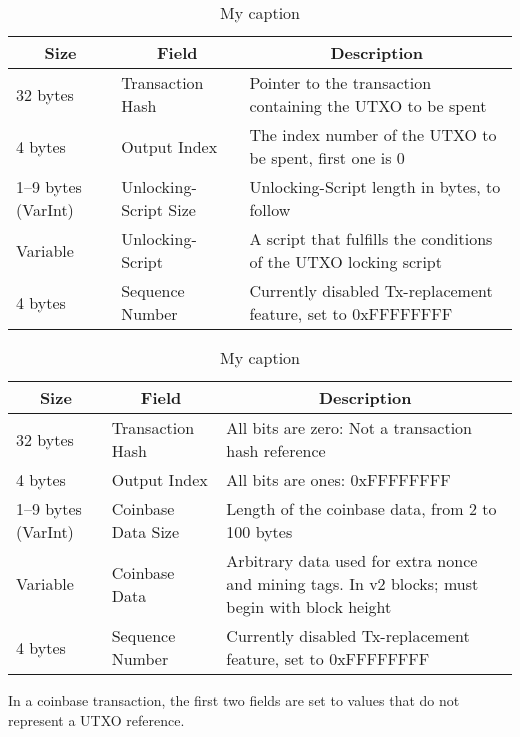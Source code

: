 \documentclass[english, 11pt]{article}
\begin{document}
\begin{table}[H]
\centering
\caption{My caption}
\label{my-label}
\begin{tabular}{|l|l|l|}
\hline
\multicolumn{1}{|c|}{\textbf{Size}} & \multicolumn{1}{c|}{\textbf{Field}} & \multicolumn{1}{c|}{\textbf{Description}} \\ \hline
32 bytes & Transaction Hash & Pointer to the transaction containing the UTXO to be spent \\ \hline
4 bytes & Output Index & The index number of the UTXO to be spent, first one is 0 \\ \hline
1–9 bytes (VarInt) & Unlocking-Script Size & Unlocking-Script length in bytes, to follow \\ \hline
Variable & Unlocking-Script & A script that fulfills the conditions of the UTXO locking script \\ \hline
4 bytes & Sequence Number & Currently disabled Tx-replacement feature, set to 0xFFFFFFFF \\ \hline
\end{tabular}
\end{table}

\begin{table}[H]
\centering
\caption{My caption}
\label{my-label}
\begin{tabular}{|l|l|l|}
\hline
\multicolumn{1}{|c|}{\textbf{Size}} & \multicolumn{1}{c|}{\textbf{Field}} & \multicolumn{1}{c|}{\textbf{Description}} \\ \hline
32 bytes & Transaction Hash & All bits are zero: Not a transaction hash reference \\ \hline
4 bytes & Output Index & All bits are ones: 0xFFFFFFFF \\ \hline
1–9 bytes (VarInt) & Coinbase Data Size & Length of the coinbase data, from 2 to 100 bytes \\ \hline
Variable & Coinbase Data & Arbitrary data used for extra nonce and mining tags. In v2 blocks; must begin with block height \\ \hline
4 bytes & Sequence Number & Currently disabled Tx-replacement feature, set to 0xFFFFFFFF \\ \hline
\end{tabular}
\end{table}

\noindent In a coinbase transaction, the first two fields are set to values that do not represent a UTXO reference. 
\end{document}
